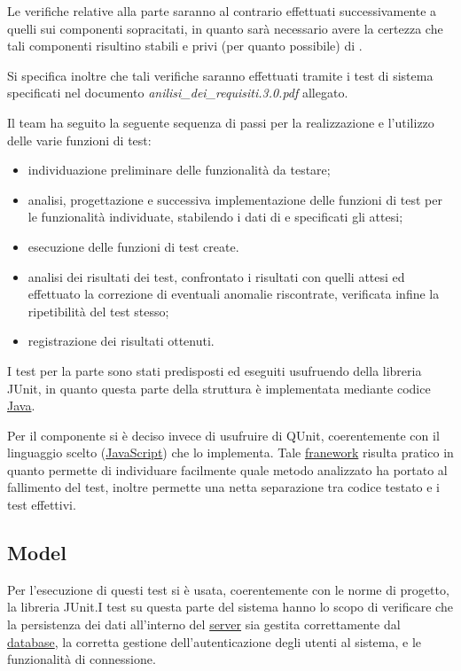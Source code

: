 Le verifiche relative alla parte  saranno al contrario effettuati successivamente a quelli sui componenti sopracitati, in quanto sarà necessario avere la certezza che tali componenti risultino stabili e privi (per quanto possibile) di .

Si specifica inoltre che tali verifiche saranno effettuati tramite i test di sistema specificati nel documento \textit{anilisi\_dei\_requisiti.3.0.pdf} allegato.
\clearpage

Il team ha seguito la seguente sequenza di passi per la realizzazione e l'utilizzo delle varie funzioni di test:
\begin{itemize}[noitemsep,nolistsep]
\item individuazione preliminare delle funzionalità da testare;
\item analisi, progettazione e successiva implementazione delle funzioni di test per le funzionalità individuate, stabilendo i dati di  e specificati gli  attesi;
\item esecuzione delle funzioni di test create.
\item analisi dei risultati dei test, confrontato i risultati con quelli attesi ed effettuato la correzione di eventuali anomalie riscontrate, verificata infine la ripetibilità del test stesso;
\item registrazione dei risultati ottenuti.
\end{itemize}

I test per la parte  sono stati predisposti ed eseguiti usufruendo della libreria JUnit, in quanto questa parte della struttura è implementata mediante codice \underline{Java}.

Per il componente  si è deciso invece di usufruire di QUnit, coerentemente con il linguaggio scelto (\underline{JavaScript}) che lo implementa. Tale \underline{franework} risulta pratico in quanto permette di individuare facilmente quale metodo analizzato ha portato al fallimento del test, inoltre permette una netta separazione tra codice testato e i test effettivi.

\subsection{Model}
Per l'esecuzione di questi test si è usata, coerentemente con le norme di progetto, la libreria JUnit.I test su questa parte del sistema hanno lo scopo di verificare che la persistenza dei dati all'interno del \underline{server} sia gestita correttamente dal \underline{database}, la corretta gestione dell'autenticazione degli utenti al sistema, e le funzionalità di connessione.

